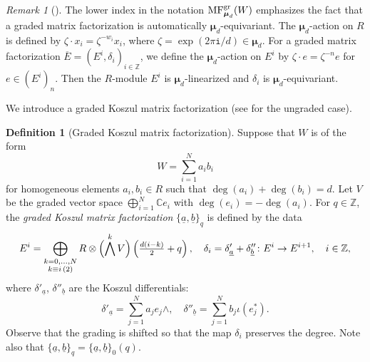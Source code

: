 \documentclass[11pt]{amsart}
\theoremstyle{definition} %
\newtheorem{defn}[thm]{Definition} %
\theoremstyle{remark} %
\newtheorem{rem}[thm]{Remark}%
\newcommand{\CC}{\mathbb C}
\newcommand{\ZZ}{\mathbb Z}
\def\MF{\operatorname{\mathsf{MF}}}
\def\MFhom{\operatorname{{MF}}}
\newcommand{\bmu}{\boldsymbol{\mu}}
\newcommand{\ov}{\overline}
\newcommand{\iu}{\mathtt{i}}
\newcommand{\ua}{\underline{a}}
\newcommand{\ub}{\underline{b}}
\begin{document}
\begin{rem}[{\cite[\S 4.4]{PVmf}}]
The lower index in the notation $\MFhom^{\rm gr}_{\bmu_d}(W)$ 
emphasizes the fact that a graded matrix factorization  
is automatically $\bmu_d$-equivariant. 
The $\bmu_d$-action on $R$ is defined by 
$\zeta \cdot x_i = \zeta^{-w_i} x_i$, where 
$\zeta = \exp(2\pi\iu/d)\in \bmu_d$. 
For a graded matrix factorization 
$\ov{E} = (E^i,\delta_{i})_{i\in \ZZ}$,  
we define the $\bmu_d$-action on $E^i$ by 
$\zeta \cdot e = \zeta^{-n} e$ for $e\in (E^i)_n$. 
Then the $R$-module $E^i$ is $\bmu_d$-linearized 
and $\delta_{i}$ is $\bmu_d$-equivariant. 
\end{rem} 


We introduce a graded Koszul matrix factorization 
(see \cite[\S 2]{BGS:CM-hypersurfaceII} 
for the ungraded case). 

\begin{defn}[Graded Koszul matrix factorization] 
\label{defn:gradedKoszul-MF}
Suppose that $W$ is of the form 
\begin{equation}
\label{eq:decomposition}
W=\sum_{i=1}^{N} a_ib_i 
\end{equation}
for homogeneous elements $a_i,b_i\in R$ such 
that $\deg(a_i) + \deg (b_i) = d$. 
Let $V$ be the graded vector space 
$\bigoplus_{i=1}^{N}  \CC e_i$ with 
$\deg(e_i)=-\deg(a_i)$. 
For $q\in \ZZ$, the \emph{graded Koszul matrix factorization} 
$\{\ua,\ub\}_q$ is defined by the data 
\[
E^i= \bigoplus_{\substack{{k=0,\dots, N}\\ {k\equiv i\, (2)}}}
R\otimes \Bigl(\bigwedge^{k} V\Bigr) 
\left(\tfrac{d(i-k)}{2}+q\right), \quad 
\delta_i = \delta'_{\ua} + \delta''_{\ub} \colon 
E^i \to E^{i+1}, \quad i\in \ZZ, 
\]
where $\delta'_{\ua}$, $\delta''_{\ub}$ 
are the Koszul differentials: 
\[
\delta'_{\ua} = \sum_{j=1}^N a_j e_j\wedge, \quad 
\delta''_{\ub} = \sum_{j=1}^N b_j \iota(e^*_j).  
\]
Observe that the grading is shifted so that 
the map $\delta_i$ preserves the degree. 
Note also that $\{\ua,\ub\}_q = \{\ua,\ub\}_0(q)$. 
\end{defn}
\end{document}
